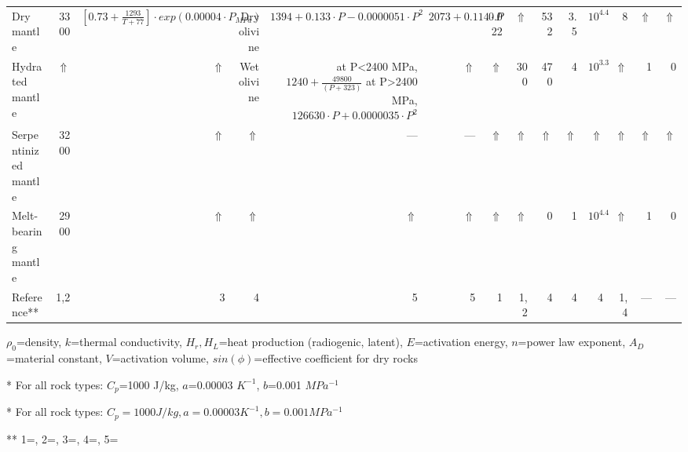 \documentclass{article}
\begin{document}
\begin{table}
\begin{threeparttable}
\begin{tabularx}{\textwidth}{L{1} R{1} R{2} R{1} R{3} R{1} R{0.75} R{0.5} R{0.5} R{0.25} R{1} R{1} R{0.5} R{0.5}}
		Dry mantle & 3300 & $[0.73+\frac{1293}{T+77}]\cdot exp(\num{0.00004}\cdot P_{MPa})$ & Dry olivine & $1394+0.133\cdot P-\num{0.0000051}\cdot P^2$ & $2073+0.114\cdot P$ & 0.022 & $\Uparrow$ & 532 & 3.5 & $10^{4.4}$ & 8 & $\Uparrow$ & $\Uparrow$ \\
		
		Hydrated mantle & $\Uparrow$ &  $\Uparrow$ & Wet olivine & at P<2400 MPa, $1240+\frac{\num{49800}}{(P+323)}$ at P>2400 MPa, $\num{126630}\cdot P+\num{0.0000035}\cdot P^2$ & $\Uparrow$ & $\Uparrow$ & 300 & 470 & 4 & $10^{3.3}$ & $\Uparrow$ & 1 & 0 \\
		
		Serpentinized mantle & 3200 & $\Uparrow$ & $\Uparrow$ & — & — & $\Uparrow$ & $\Uparrow$ & $\Uparrow$ & $\Uparrow$ & $\Uparrow$ & $\Uparrow$ & $\Uparrow$ & $\Uparrow$ \\
		
		Melt-bearing mantle & 2900 & $\Uparrow$ & $\Uparrow$ & $\Uparrow$ & $\Uparrow$ & $\Uparrow$ & $\Uparrow$ & 0 & 1 & $10^{4.4}$ & $\Uparrow$ & 1 & 0 \\
		
		\midrule
		
		Reference** & 1,2 & 3 & 4 & 5 & 5 & 1 & 1,2 & 4 & 4 & 4 & 1,4 & — & — \\
		
		\bottomrule
		
		
	\end{tabularx}
\begin{tablenotes}
	\item $\rho_0$=density, $k$=thermal conductivity, $H_r, H_L$=heat production (radiogenic, latent), $E$=activation energy, $n$=power law exponent, $A_D$=material constant, $V$=activation volume, $sin(\phi)$=effective coefficient for dry rocks
	\item [*] For all rock types: $C_p$=1000 J/kg, $a$=\num{0.00003} $K^{-1}$, $b$=\num{0.001} $MPa^{-1}$
	\item [*] For all rock types: $C_p=1000 J/kg, a=\num{0.00003} K^{-1}, b=\num{0.001} MPa^{-1}$
	\item [**] 1=\cite{Turcotte2002}, 2=\cite{Bittner1995}, 3=\cite{Clauser1995}, 4=\cite{Ranalli1995}, 5=\cite{Schmidt1998}
\end{tablenotes}
\end{threeparttable}
\end{table}
\end{document}
